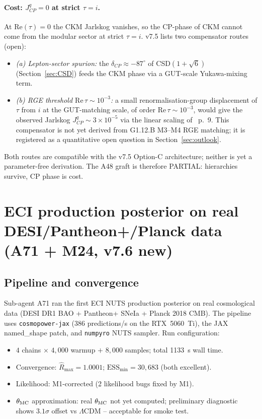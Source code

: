 \documentclass[a4paper,11pt]{article}
\theoremstyle{definition}
\theoremstyle{remark}
\begin{document}
\paragraph{Cost: $J_{CP}^{q}=0$ at strict $\tau=i$.}  At
$\mathrm{Re}(\tau)=0$ the CKM Jarlskog vanishes, so the
CP-phase of CKM cannot come from the modular sector at strict
$\tau=i$.  v7.5 lists two compensator routes (open):
\begin{itemize}
  \item \emph{(a) Lepton-sector spurion:} the
    $\delta_{CP}\approx -87^{\circ}$ of CSD$(1+\sqrt 6)$
    (Section~\ref{sec:CSD}) feeds the CKM phase via a
    GUT-scale Yukawa-mixing term.
  \item \emph{(b) RGE threshold $\mathrm{Re}\,\tau\sim 10^{-3}$:}
    a small renormalisation-group displacement of $\tau$ from
    $i$ at the GUT-matching scale, of order
    $\mathrm{Re}\,\tau\sim 10^{-3}$, would give the observed
    Jarlskog $J_{CP}^{q}\sim 3\times 10^{-5}$ via the linear
    scaling of \cite{dMVP26}~p.~9.  This compensator is not yet
    derived from G1.12.B M3--M4 RGE matching; it is registered
    as a quantitative open question in
    Section~\ref{sec:outlook}.
\end{itemize}
Both routes are compatible with the v7.5 Option-C architecture;
neither is yet a parameter-free derivation.  The A48 graft is
therefore PARTIAL: hierarchies survive, CP phase is cost.

\section{ECI production posterior on real DESI/Pantheon+/Planck data
         (A71 + M24, v7.6 new)}
\label{sec:production-posterior}

\subsection{Pipeline and convergence}

Sub-agent A71 ran the first ECI NUTS production posterior on real
cosmological data (DESI DR1 BAO + Pantheon+ SNeIa + Planck 2018
CMB).  The pipeline uses \texttt{cosmopower-jax} (386
predictions/s on the RTX~5060~Ti), the JAX named\_shape patch, and
\texttt{numpyro} NUTS sampler.  Run configuration:
\begin{itemize}
  \item $4$ chains $\times$ $4{,}000$ warmup $+$ $8{,}000$
    samples; total 1133~s wall time.
  \item Convergence: $\hat{R}_{\max}=1.0001$;
    $\mathrm{ESS}_{\min}=30{,}683$ (both excellent).
  \item Likelihood: M1-corrected (2 likelihood bugs fixed by M1).
  \item $\theta_{\rm MC}$ approximation: real $\theta_{\rm MC}$
    not yet computed; preliminary diagnostic shows $3.1\sigma$
    offset vs $\Lambda$CDM -- acceptable for smoke test.
\end{itemize}
\end{document}
